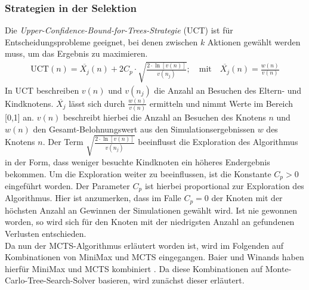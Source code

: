 \documentclass[12pt,a4paper,bibliography=totocnumbered,listof=totocnumbered]{article}
\begin{document}
\subsubsection{Strategien in der Selektion} \label{sec:strat_sek}
Die \emph{Upper-Confidence-Bound-for-Trees-Strategie} (UCT) ist für Entscheidungsprobleme geeignet, bei denen zwischen $k$ Aktionen gewählt werden muss, um das Ergebnis zu maximieren.
\begin{align}
\text{UCT}(n) = \overline{X_{j}}(n) + 2C_{p} \cdot \sqrt{\frac{2 \cdot \ln{[v(n)]}}{v(n_j)} };   \quad \textrm{mit} \quad \overline{X_{j}}(n) = \frac{w(n)}{v(n)}
\label{eq:uct}
\end{align} 
In UCT beschreiben $v(n)$ und $v(n_{j})$ die Anzahl an Besuchen des Eltern- und Kindknotens. $\overline{X_{j}}$ lässt sich durch $\frac{w(n)}{v(n)}$ ermitteln und nimmt Werte im Bereich [0,1] an. $v(n)$ beschreibt hierbei die Anzahl an Besuchen des Knotens $n$ und $w(n)$ den Gesamt-Belohnungswert aus den Simulationsergebnissen $w$ des Knotens $n$. Der  Term $ \sqrt{\frac{2 \cdot \ln{[v(n)]}}{v(n_j)} }$ beeinflusst die Exploration des Algorithmus in der Form, dass weniger besuchte Kindknoten ein höheres Endergebnis bekommen. Um die Exploration weiter zu beeinflussen, ist die Konstante $C_{p} > 0$ eingeführt worden. Der Parameter $C_{p}$ ist hierbei proportional zur Exploration des Algorithmus. Hier ist anzumerken, dass im Falle $C_{p} = 0$ der Knoten mit der höchsten Anzahl an Gewinnen der Simulationen gewählt wird. Ist nie gewonnen worden, so wird sich für den Knoten mit der niedrigsten Anzahl an gefundenen Verlusten entschieden. \citep{CameronBrowne.2012}\\
Da nun der MCTS-Algorithmus erläutert worden ist, wird im Folgenden auf Kombinationen von MiniMax und MCTS eingegangen. Baier und Winands haben hierfür MiniMax und MCTS kombiniert \cite{Baier.2015}. Da diese Kombinationen auf Monte-Carlo-Tree-Search-Solver basieren, wird zunächst dieser erläutert.
\end{document}
